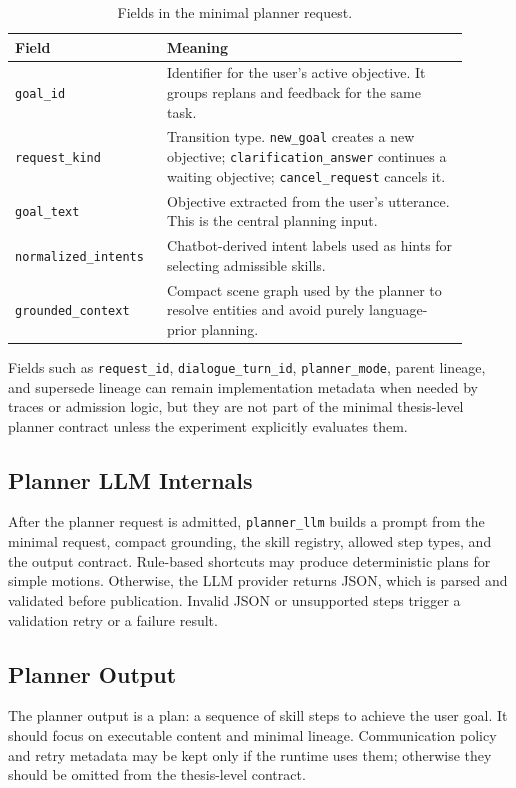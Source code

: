 \documentclass[12pt,a4paper]{article}
\newcommand{\code}[1]{\texttt{#1}}
\begin{document}
\begin{longtable}{p{0.28\linewidth}p{0.62\linewidth}}
\caption{Fields in the minimal planner request.}\label{tab:planner-request-fields}\\
\toprule
Field & Meaning\\
\midrule
\code{goal\_id} & Identifier for the user's active objective. It groups replans and feedback for the same task.\\
\code{request\_kind} & Transition type. \code{new\_goal} creates a new objective; \code{clarification\_answer} continues a waiting objective; \code{cancel\_request} cancels it.\\
\code{goal\_text} & Objective extracted from the user's utterance. This is the central planning input.\\
\code{normalized\_intents} & Chatbot-derived intent labels used as hints for selecting admissible skills.\\
\code{grounded\_context} & Compact scene graph used by the planner to resolve entities and avoid purely language-prior planning.\\
\bottomrule
\end{longtable}

Fields such as \code{request\_id}, \code{dialogue\_turn\_id}, \code{planner\_mode}, parent lineage, and supersede lineage can remain implementation metadata when needed by traces or admission logic, but they are not part of the minimal thesis-level planner contract unless the experiment explicitly evaluates them.

\subsection{Planner LLM Internals}

After the planner request is admitted, \code{planner\_llm} builds a prompt from the minimal request, compact grounding, the skill registry, allowed step types, and the output contract. Rule-based shortcuts may produce deterministic plans for simple motions. Otherwise, the LLM provider returns JSON, which is parsed and validated before publication. Invalid JSON or unsupported steps trigger a validation retry or a failure result.

\subsection{Planner Output}

The planner output is a plan: a sequence of skill steps to achieve the user goal. It should focus on executable content and minimal lineage. Communication policy and retry metadata may be kept only if the runtime uses them; otherwise they should be omitted from the thesis-level contract.
\end{document}
